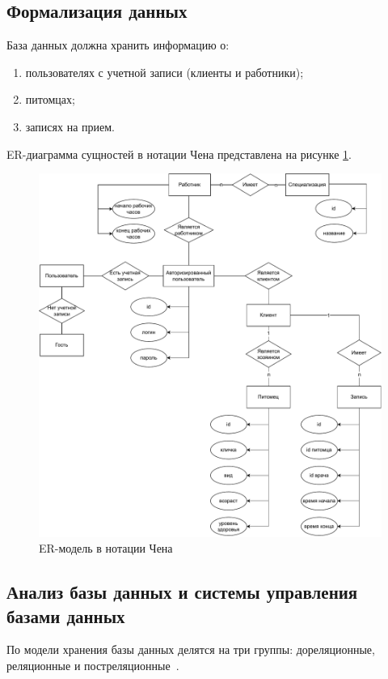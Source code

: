 \subsection{Формализация данных}

База данных должна хранить информацию о:
\begin{enumerate}[label*=---]
	\item пользователях с учетной записи (клиенты и работники);
	\item питомцах;
	\item записях на прием.
\end{enumerate}

ER-диаграмма сущностей в нотации Чена представлена на рисунке \ref{img:er}.

\begin{figure}[!h!]
	\centering
	\includegraphics[width=165mm]{image/er.pdf}
	\caption{ER-модель в нотации Чена}
	\label{img:er}
\end{figure}

\subsection{Анализ базы данных и системы управления базами данных}

По модели хранения базы данных делятся на три группы: дореляционные, реляционные и постреляционные~\cite{Date}. 

